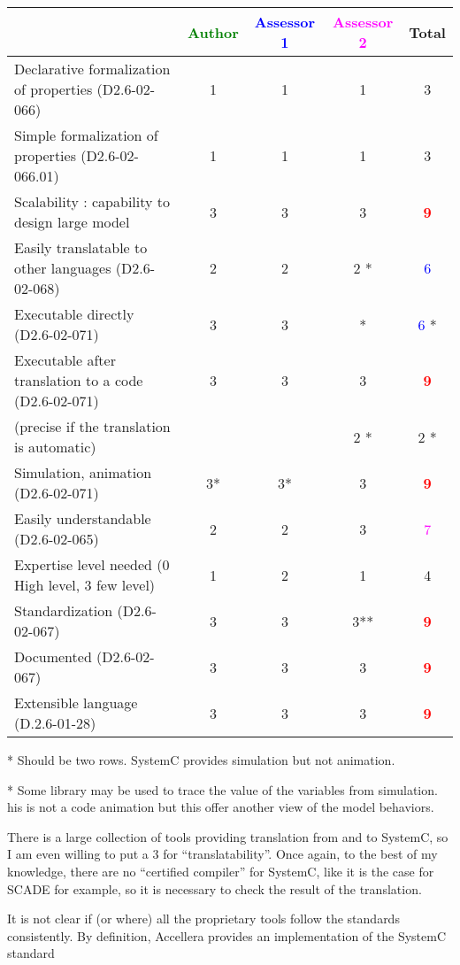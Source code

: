 \begin{tabular}{|l | c | c | c | c|}
  \hline
  & \textcolor{green}{Author} & \textcolor{blue}{Assessor 1} & \textcolor{magenta}{Assessor 2} & Total \\
  \hline
  Declarative formalization of properties (D2.6-02-066) &1 &1 & 1    & 3     \\
  \hline
  Simple formalization of properties (D2.6-02-066.01) &1 &1 &1 & 3     \\
  \hline
  Scalability : capability to design large model &3 &3 & 3     & \textcolor{red}{\textbf{9}} \\
  \hline
  Easily translatable to other languages (D2.6-02-068) & 2     & 2      & 2    * & \textcolor{blue}{6} \\
  \hline
  Executable directly (D2.6-02-071) &3 & 3      & * & \textcolor{blue}{6} * \\
  \hline
  Executable after translation to a code (D2.6-02-071) &3 &3 &3 & \textcolor{red}{\textbf{9}} \\
  (precise if the translation is automatic) & & & 2    *& 2    *\\
  \hline
  Simulation, animation (D2.6-02-071) &3* &3* &3 & \textcolor{red}{\textbf{9}} \\
  \hline
  Easily understandable (D2.6-02-065) &2 &2 &3 & \textcolor{magenta}{7} \\
  \hline
  Expertise level needed (0 High level, 3 few level) &1 &2 &1 & 4     \\
  \hline
  Standardization (D2.6-02-067) &3 &3 &3** & \textcolor{red}{\textbf{9}} \\
  \hline
  Documented (D2.6-02-067) &3 &3 &3 & \textcolor{red}{\textbf{9}} \\
  \hline
  Extensible language (D.2.6-01-28) &3 &3 &3 & \textcolor{red}{\textbf{9}} \\
  \hline
\end{tabular}

\begin{author_comment}
* Should be two rows. SystemC provides simulation but not animation.
\end{author_comment}
\begin{assessor1}
* Some library may be used to trace the value of  the variables from
simulation. his is not a code animation but this offer another view of
the model behaviors.
\end{assessor1}

\begin{assessor2}
\item[(*)] There is a large collection of tools providing translation
  from and to SystemC, so I am even willing to put a 3 for
  ``translatability''. Once again, to the best of my knowledge, there
  are no ``certified compiler'' for SystemC, like it is the case for
  SCADE for example, so it is necessary to check the result of the
  translation.
\item[(**)] It is not clear if (or where) all the proprietary tools
  follow the standards consistently. By definition, Accellera provides
  an implementation of the SystemC standard 
\end{assessor2}

